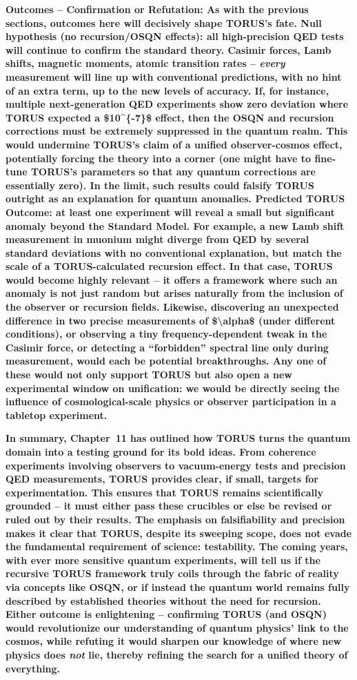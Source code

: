 \documentclass[]{article}
\begin{document}
\textbf{Outcomes -- Confirmation or Refutation: As with the previous
sections, outcomes here will decisively shape TORUS's fate. Null
hypothesis (no recursion/OSQN effects): all high-precision QED tests
will continue to confirm the standard theory. Casimir forces, Lamb
shifts, magnetic moments, atomic transition rates -- \emph{every}
measurement will line up with conventional predictions, with no hint of
an extra term, up to the new levels of accuracy. If, for instance,
multiple next-generation QED experiments show zero deviation where TORUS
expected a \$10\^{}\{-7\}\$ effect, then the OSQN and recursion
corrections must be extremely suppressed in the quantum realm. This
would undermine TORUS's claim of a unified observer-cosmos effect,
potentially forcing the theory into a corner (one might have to
fine-tune TORUS's parameters so that any quantum corrections are
essentially zero). In the limit, such results could falsify TORUS
outright as an explanation for quantum anomalies. Predicted TORUS
Outcome: at least one experiment will reveal a small but significant
anomaly beyond the Standard Model. For example, a new Lamb shift
measurement in muonium might diverge from QED by several standard
deviations with no conventional explanation, but match the scale of a
TORUS-calculated recursion effect. In that case, TORUS would become
highly relevant -- it offers a framework where such an anomaly is not
just random but arises naturally from the inclusion of the observer or
recursion fields. Likewise, discovering an unexpected difference in two
precise measurements of \$\textbackslash{}alpha\$ (under different
conditions), or observing a tiny frequency-dependent tweak in the
Casimir force, or detecting a ``forbidden'' spectral line only during
measurement, would each be potential breakthroughs. Any one of these
would not only support TORUS but also open a new experimental window on
unification: we would be directly seeing the influence of
cosmological-scale physics or observer participation in a tabletop
experiment.}

\textbf{In summary, Chapter~11 has outlined how TORUS turns the quantum
domain into a testing ground for its bold ideas. From coherence
experiments involving observers to vacuum-energy tests and precision QED
measurements, TORUS provides clear, if small, targets for
experimentation. This ensures that TORUS remains scientifically grounded
-- it must either pass these crucibles or else be revised or ruled out
by their results. The emphasis on falsifiability and precision makes it
clear that TORUS, despite its sweeping scope, does not evade the
fundamental requirement of science: testability. The coming years, with
ever more sensitive quantum experiments, will tell us if the recursive
TORUS framework truly coils through the fabric of reality via concepts
like OSQN, or if instead the quantum world remains fully described by
established theories without the need for recursion. Either outcome is
enlightening -- confirming TORUS (and OSQN) would revolutionize our
understanding of quantum physics' link to the cosmos, while refuting it
would sharpen our knowledge of where new physics does \emph{not} lie,
thereby refining the search for a unified theory of everything.}
\end{document}
